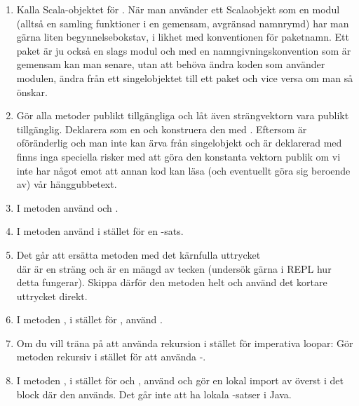 \begin{enumerate}

\item Kalla Scala-objektet för . När man använder ett Scalaobjekt som en modul (alltså en samling funktioner i en gemensam, avgränsad namnrymd) har man gärna liten begynnelsebokstav, i likhet med konventionen för paketnamn. Ett paket är ju också en slags modul och med en namngivningskonvention som är gemensam kan man senare, utan att behöva ändra koden som använder modulen, ändra från ett singelobjektet till ett paket och vice versa om man så önskar.

\item Gör alla metoder publikt tillgängliga och låt även strängvektorn  vara publikt tillgänglig. Deklarera  som en  och konstruera den med . Eftersom  är oföränderlig och man inte kan ärva från singelobjekt och  är deklarerad med  finns inga speciella risker med att göra den konstanta vektorn publik om  vi inte har något emot att annan kod kan läsa (och eventuellt göra sig beroende av) vår hänggubbetext.

\item I metoden  använd  och .

\item I metoden  använd  i stället för en -sats.

\item Det går att ersätta metoden  med det kärnfulla uttrycket \\  där  är en sträng och  är en mängd av tecken (undersök gärna i REPL hur detta fungerar). Skippa därför den metoden helt och använd det kortare uttrycket direkt.

\item I metoden , i stället för , använd .

\item Om du vill träna på att använda rekursion i stället för imperativa loopar: Gör metoden  rekursiv i stället för att använda -.

\item I metoden , i stället för  och , använd  och gör en lokal import av  överst i det block där den används. Det går inte att ha lokala -satser i Java.


\end{enumerate}
